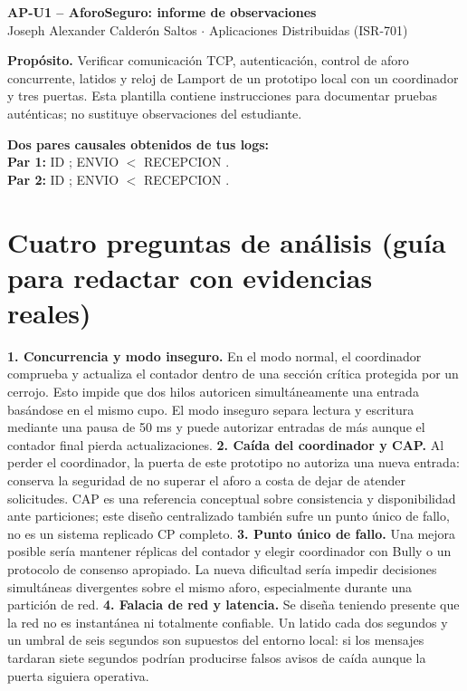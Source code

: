 \documentclass[10pt,a4paper]{article}
\begin{document}
\begin{center}
{\large\bfseries AP-U1 -- AforoSeguro: informe de observaciones}\\
Joseph Alexander Calderón Saltos $\cdot$ Aplicaciones Distribuidas (ISR-701)
\end{center}
\textbf{Propósito.} Verificar comunicación TCP, autenticación, control de aforo concurrente, latidos y reloj de Lamport de un prototipo local con un coordinador y tres puertas. Esta plantilla contiene instrucciones para documentar pruebas auténticas; no sustituye observaciones del estudiante.


\newpage

\textbf{Dos pares causales obtenidos de tus logs:}\\
\textbf{Par 1:} ID \underline{\hspace{5cm}}; ENVIO \underline{\hspace{1cm}} $<$ RECEPCION \underline{\hspace{1cm}}.\\
\textbf{Par 2:} ID \underline{\hspace{5cm}}; ENVIO \underline{\hspace{1cm}} $<$ RECEPCION \underline{\hspace{1cm}}.\\

\section*{Cuatro preguntas de análisis (guía para redactar con evidencias reales)}
\textbf{1. Concurrencia y modo inseguro.} En el modo normal, el coordinador comprueba y actualiza el contador dentro de una sección crítica protegida por un cerrojo. Esto impide que dos hilos autoricen simultáneamente una entrada basándose en el mismo cupo. El modo inseguro separa lectura y escritura mediante una pausa de 50 ms y puede autorizar entradas de más aunque el contador final pierda actualizaciones.
\textbf{2. Caída del coordinador y CAP.} Al perder el coordinador, la puerta de este prototipo no autoriza una nueva entrada: conserva la seguridad de no superar el aforo a costa de dejar de atender solicitudes. CAP es una referencia conceptual sobre consistencia y disponibilidad ante particiones; este diseño centralizado también sufre un punto único de fallo, no es un sistema replicado CP completo.
\textbf{3. Punto único de fallo.} Una mejora posible sería mantener réplicas del contador y elegir coordinador con Bully o un protocolo de consenso apropiado. La nueva dificultad sería impedir decisiones simultáneas divergentes sobre el mismo aforo, especialmente durante una partición de red.
\textbf{4. Falacia de red y latencia.} Se diseña teniendo presente que la red no es instantánea ni totalmente confiable. Un latido cada dos segundos y un umbral de seis segundos son supuestos del entorno local: si los mensajes tardaran siete segundos podrían producirse falsos avisos de caída aunque la puerta siguiera operativa.
\end{document}
